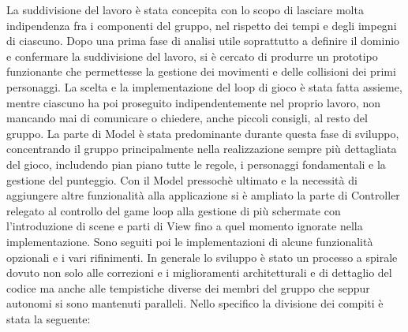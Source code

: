\documentclass[a4paper,12pt, hidelinks]{report}
\begin{document}
La suddivisione del lavoro è stata concepita con lo scopo di lasciare molta indipendenza fra i componenti del gruppo, nel rispetto dei tempi e degli impegni di ciascuno. Dopo una prima fase di analisi utile soprattutto a definire il dominio e confermare la suddivisione del lavoro, si è cercato di produrre un prototipo funzionante che permettesse la gestione dei movimenti e delle collisioni dei primi personaggi. La scelta e la implementazione del loop di gioco è stata fatta assieme, mentre ciascuno ha poi proseguito indipendentemente nel proprio lavoro, non mancando mai di comunicare o chiedere, anche piccoli consigli, al resto del gruppo. La parte di Model è stata predominante durante questa fase di sviluppo, concentrando il gruppo principalmente nella realizzazione sempre più dettagliata del gioco, includendo pian piano tutte le regole, i personaggi fondamentali e la gestione del punteggio. Con il Model pressochè ultimato e la necessità di aggiungere altre funzionalità alla applicazione si è ampliato la parte di Controller relegato al controllo del game loop alla gestione di più schermate con l'introduzione di scene e parti di View fino a quel momento ignorate nella implementazione. Sono seguiti poi le implementazioni di alcune funzionalità opzionali e i vari rifinimenti. In generale lo sviluppo è stato un processo a spirale dovuto non solo alle correzioni e i miglioramenti architetturali e di dettaglio del codice ma anche alle tempistiche diverse dei membri del gruppo che seppur autonomi si sono mantenuti paralleli.
Nello specifico la divisione dei compiti è stata la seguente:
\end{document}
